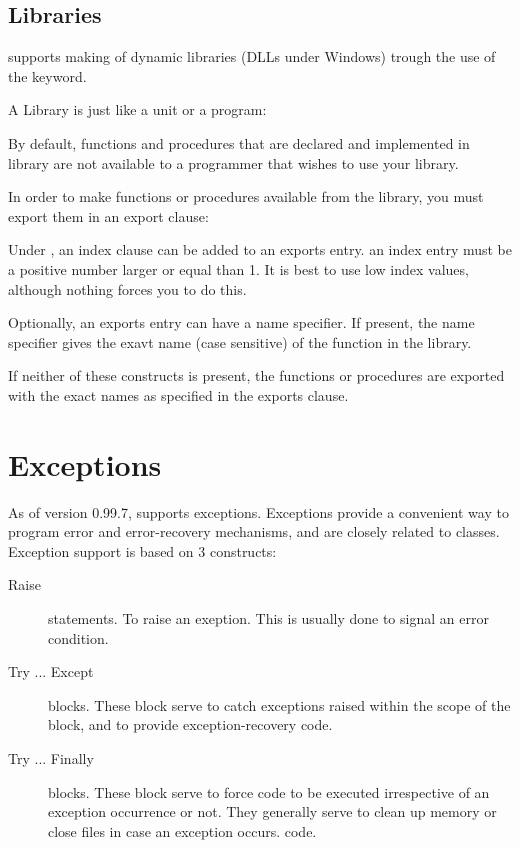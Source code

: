 \documentclass{report}
\begin{document}
\section{Libraries}
\fpc supports making of dynamic libraries (DLLs under Windows) trough
the use of the  keyword.

A Library is just like a unit or a program:


By default, functions and procedures that are declared and implemented in
library are not available to a programmer that wishes to use your library.

In order to make functions or procedures available from the library,
you must export them in an export clause:



Under \windowsnt, an index clause can be added to an exports entry.
an index entry must be a positive number larger or equal than 1.
It is best to use low index values, although nothing forces you to
do this.

Optionally, an exports entry can have a name specifier. If present, the name
specifier gives the exavt name (case sensitive) of the function in the
library.

If neither of these constructs is present, the functions or procedures
are exported with the exact names as specified in the exports clause.


\chapter{Exceptions}
\label{ch:Exceptions}
As of version 0.99.7, \fpc supports exceptions. Exceptions provide a
convenient way to program error and error-recovery mechanisms, and are
closely related to classes.
Exception support is based on 3 constructs:
\begin{description}
\item [Raise\ ] statements. To raise an exeption. This is usually done to signal an
error condition.
\item [Try ... Except\ ] blocks. These block serve to catch exceptions
raised within the scope of the block, and to provide exception-recovery
code.
\item [Try ... Finally\ ] blocks. These block serve to force code to be
executed irrespective of an exception occurrence or not. They generally
serve to clean up memory or close files in case an exception occurs.
code.
\end{description}
\end{document}
